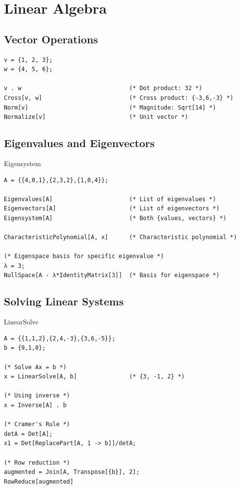 \documentclass[12pt,a4paper]{article}
\begin{document}
\section{Linear Algebra}

\subsection{Vector Operations}

\begin{commandbox}
\begin{lstlisting}
v = {1, 2, 3};
w = {4, 5, 6};

v . w                               (* Dot product: 32 *)
Cross[v, w]                         (* Cross product: {-3,6,-3} *)
Norm[v]                             (* Magnitude: Sqrt[14] *)
Normalize[v]                        (* Unit vector *)
\end{lstlisting}
\end{commandbox}

\subsection{Eigenvalues and Eigenvectors}

\begin{mainbox}{Eigensystem}
\begin{lstlisting}
A = {{4,0,1},{2,3,2},{1,0,4}};

Eigenvalues[A]                      (* List of eigenvalues *)
Eigenvectors[A]                     (* List of eigenvectors *)
Eigensystem[A]                      (* Both {values, vectors} *)

CharacteristicPolynomial[A, x]      (* Characteristic polynomial *)

(* Eigenspace basis for specific eigenvalue *)
λ = 3;
NullSpace[A - λ*IdentityMatrix[3]]  (* Basis for eigenspace *)
\end{lstlisting}
\end{mainbox}

\subsection{Solving Linear Systems}

\begin{mainbox}{LinearSolve}
\begin{lstlisting}
A = {{1,1,2},{2,4,-3},{3,6,-5}};
b = {9,1,0};

(* Solve Ax = b *)
x = LinearSolve[A, b]               (* {3, -1, 2} *)

(* Using inverse *)
x = Inverse[A] . b

(* Cramer's Rule *)
detA = Det[A];
x1 = Det[ReplacePart[A, 1 -> b]]/detA;

(* Row reduction *)
augmented = Join[A, Transpose[{b}], 2];
RowReduce[augmented]
\end{lstlisting}
\end{mainbox}
\end{document}
